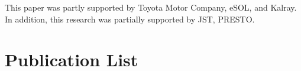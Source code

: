 \documentclass[a4j,12pt,oneside,openany,english]{jsbook}
\begin{document}




\begin{acknowledgement}
  This paper was partly supported by Toyota Motor Company, eSOL, and Kalray.
  In addition, this research was partially supported by JST, PRESTO.
\end{acknowledgement}







\chapter*{Publication List}

\end{document}
